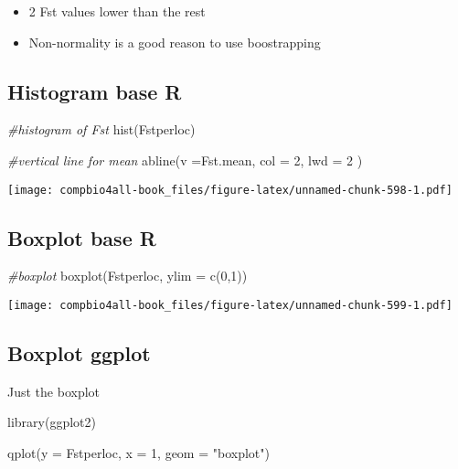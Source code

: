 \documentclass[
]{book}
\newenvironment{Shaded}{\begin{snugshade}}{\end{snugshade}}
\newcommand{\AttributeTok}[1]{\textcolor[rgb]{0.77,0.63,0.00}{#1}}
\newcommand{\CommentTok}[1]{\textcolor[rgb]{0.56,0.35,0.01}{\textit{#1}}}
\newcommand{\DecValTok}[1]{\textcolor[rgb]{0.00,0.00,0.81}{#1}}
\newcommand{\FunctionTok}[1]{\textcolor[rgb]{0.00,0.00,0.00}{#1}}
\newcommand{\NormalTok}[1]{#1}
\newcommand{\StringTok}[1]{\textcolor[rgb]{0.31,0.60,0.02}{#1}}
\providecommand{\tightlist}{%
  \setlength{\itemsep}{0pt}\setlength{\parskip}{0pt}}
\begin{document}
\begin{itemize}
\tightlist
\item
  2 Fst values lower than the rest
\item
  Non-normality is a good reason to use boostrapping
\end{itemize}

\hypertarget{histogram-base-r}{%
\subsection{Histogram base R}\label{histogram-base-r}}

\begin{Shaded}
\begin{Highlighting}[]
\CommentTok{\#histogram of Fst}
\FunctionTok{hist}\NormalTok{(Fstperloc)}

\CommentTok{\#vertical line for mean}
\FunctionTok{abline}\NormalTok{(}\AttributeTok{v =}\NormalTok{Fst.mean, }\AttributeTok{col =} \DecValTok{2}\NormalTok{, }\AttributeTok{lwd =} \DecValTok{2}\NormalTok{ )}
\end{Highlighting}
\end{Shaded}

\texttt{[image: compbio4all-book\_files/figure-latex/unnamed-chunk-598-1.pdf]}

\hypertarget{boxplot-base-r}{%
\subsection{Boxplot base R}\label{boxplot-base-r}}

\begin{Shaded}
\begin{Highlighting}[]
\CommentTok{\#boxplot}
\FunctionTok{boxplot}\NormalTok{(Fstperloc,}
        \AttributeTok{ylim =} \FunctionTok{c}\NormalTok{(}\DecValTok{0}\NormalTok{,}\DecValTok{1}\NormalTok{))}
\end{Highlighting}
\end{Shaded}

\texttt{[image: compbio4all-book\_files/figure-latex/unnamed-chunk-599-1.pdf]}

\hypertarget{boxplot-ggplot}{%
\subsection{Boxplot ggplot}\label{boxplot-ggplot}}

Just the boxplot

\begin{Shaded}
\begin{Highlighting}[]
\FunctionTok{library}\NormalTok{(ggplot2)}

\FunctionTok{qplot}\NormalTok{(}\AttributeTok{y =}\NormalTok{ Fstperloc,}
      \AttributeTok{x =} \DecValTok{1}\NormalTok{, }
      \AttributeTok{geom =} \StringTok{"boxplot"}\NormalTok{)}
\end{Highlighting}
\end{Shaded}
\end{document}
